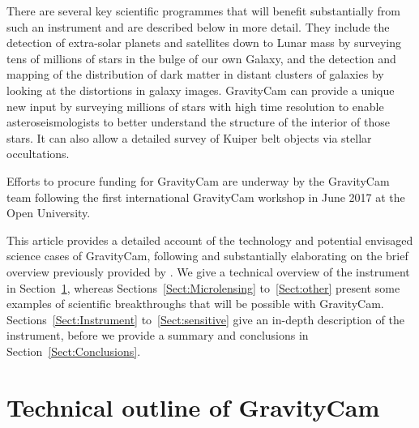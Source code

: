 \documentclass{pasa}%
\begin{document}
There are several key scientific programmes that will benefit substantially from such an instrument and are described below in more detail.  They include the detection of extra-solar planets and satellites down to Lunar mass by surveying tens of millions of stars in the bulge of our own Galaxy, and the detection and mapping of the distribution of dark matter in distant clusters of galaxies by looking at the distortions in galaxy images.  \mbox{GravityCam} can provide a unique new input by surveying millions of stars with high time resolution to enable asteroseismologists to better understand the structure of the interior of those stars. It can also allow a detailed survey of Kuiper belt objects via stellar occultations.

Efforts to procure funding for GravityCam are underway by the GravityCam team
following the first international GravityCam workshop in June 2017 at the Open University.

This article provides a detailed account of the technology and potential envisaged science cases of GravityCam, following and substantially elaborating on the brief overview previously provided by \citet{SPIE:GravityCam}.
We give a technical overview of the instrument in Section~\ref{Sect:outline}, whereas Sections~\ref{Sect:Microlensing} to~\ref{Sect:other} present some examples of scientific breakthroughs that will be possible with GravityCam. Sections~\ref{Sect:Instrument} to~\ref{Sect:sensitive} give an in-depth description of the instrument, before we provide a summary and conclusions in Section~\ref{Sect:Conclusions}.

\section{Technical outline of GravityCam}
\label{Sect:outline}


\end{document}
